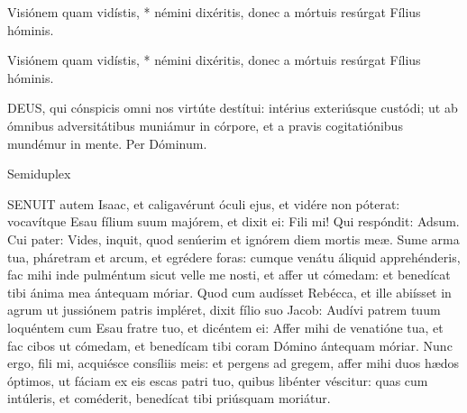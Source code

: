 Visiónem quam vidístis, * némini dixéritis, donec a mórtuis resúrgat Fílius hóminis.


 Visiónem quam vidístis, * némini dixéritis, donec a mórtuis resúrgat Fílius hóminis.


\lettrine[lines=2]{D}{EUS}, qui cónspicis omni nos virtúte destítui: intérius exteriúsque custódi; ut ab ómnibus adversitátibus muniámur in córpore, et a pravis cogitatiónibus mundémur in mente. Per Dóminum.

\sectionornament



 Semiduplex





\lettrine[lines=2]{S}{ENUIT} autem Isaac, et caligavérunt óculi ejus, et vidére non póterat: vocavítque Esau fílium suum majórem, et dixit ei: Fili mi! Qui respóndit: Adsum. Cui pater: Vides, inquit, quod senúerim et ignórem diem mortis meæ. Sume arma tua, pháretram et arcum, et egrédere foras: cumque venátu áliquid apprehénderis, fac mihi inde pulméntum sicut velle me nosti, et affer ut cómedam: et benedícat tibi ánima mea ántequam móriar. Quod cum audísset Rebécca, et ille abiísset in agrum ut jussiónem patris impléret, dixit fílio suo Jacob: Audívi patrem tuum loquéntem cum Esau fratre tuo, et dicéntem ei: Affer mihi de venatióne tua, et fac cibos ut cómedam, et benedícam tibi coram Dómino ántequam móriar. Nunc ergo, fili mi, acquiésce consíliis meis: et pergens ad gregem, affer mihi duos hædos óptimos, ut fáciam ex eis escas patri tuo, quibus libénter véscitur: quas cum intúleris, et coméderit, benedícat tibi priúsquam moriátur.


